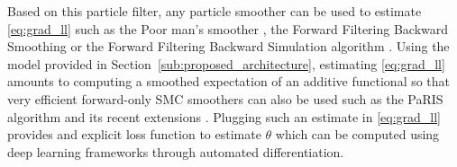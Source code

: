 \documentclass{article}
\begin{document}
Based on this particle filter, any particle smoother can be used to estimate \eqref{eq:grad_ll} such as the Poor man's smoother \cite{Kitagawa1996}, the Forward Filtering Backward Smoothing \cite{Doucet2000OnSM} or the Forward Filtering Backward Simulation algorithm \cite{Godsill2004MonteCS}.
Using the model provided in Section~\ref{sub:proposed_architecture}, estimating \eqref{eq:grad_ll} amounts to computing a smoothed expectation of an additive functional so that very efficient forward-only SMC smoothers can also be used such as the PaRIS algorithm \cite{Olsson2014EfficientPO} and its recent extensions \cite{}. 
Plugging such an estimate in \ref{eq:grad_ll} provides and explicit loss function to estimate $\theta$ which can be computed using deep learning frameworks through automated differentiation. %
\end{document}
